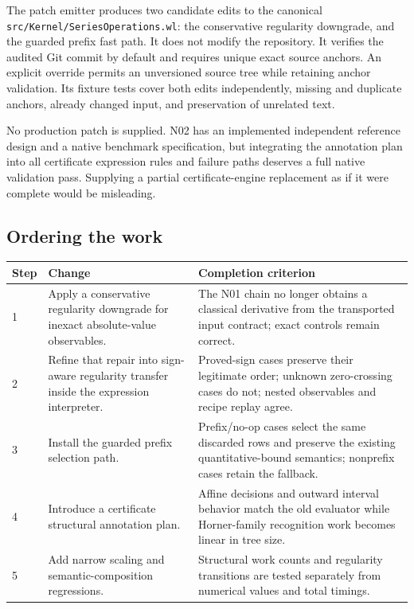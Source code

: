 \documentclass[11pt,a4paper]{article}
\newcommand{\code}[1]{\texttt{\detokenize{#1}}}
\newcommand{\file}[1]{\nolinkurl{#1}}
\begin{document}
The patch emitter produces two candidate edits to the canonical
\file{src/Kernel/SeriesOperations.wl}: the conservative \code{Abs} regularity
downgrade, and the guarded prefix fast path. It does not modify the repository.
It verifies the audited Git commit by default and requires unique exact source
anchors. An explicit override permits an unversioned source tree while retaining
anchor validation. Its fixture tests cover both edits independently, missing and
duplicate anchors, already changed input, and preservation of unrelated text.

No production \code{InverseCertificates.wl} patch is supplied. N02 has an
implemented independent reference design and a native benchmark specification,
but integrating the annotation plan into all certificate expression rules and
failure paths deserves a full native validation pass. Supplying a partial
certificate-engine replacement as if it were complete would be misleading.

\subsection{Ordering the work}
\begin{longtable}{@{}L{12mm}L{62mm}L{\dimexpr\textwidth-74mm-4\tabcolsep\relax}@{}}
\toprule Step & Change & Completion criterion\\\midrule{} & Apply a conservative regularity downgrade for inexact absolute-value observables. & The N01 chain no longer obtains a classical derivative from the transported input contract; exact controls remain correct.\\
2 & Refine that repair into sign-aware regularity transfer inside the expression interpreter. & Proved-sign cases preserve their legitimate order; unknown zero-crossing cases do not; nested observables and recipe replay agree.\\
3 & Install the guarded prefix selection path. & Prefix/no-op cases select the same discarded rows and preserve the existing quantitative-bound semantics; nonprefix cases retain the fallback.\\
4 & Introduce a certificate structural annotation plan. & Affine decisions and outward interval behavior match the old evaluator while Horner-family recognition work becomes linear in tree size.\\
5 & Add narrow scaling and semantic-composition regressions. & Structural work counts and regularity transitions are tested separately from numerical values and total timings.\\
\bottomrule
\end{longtable}
\end{document}
